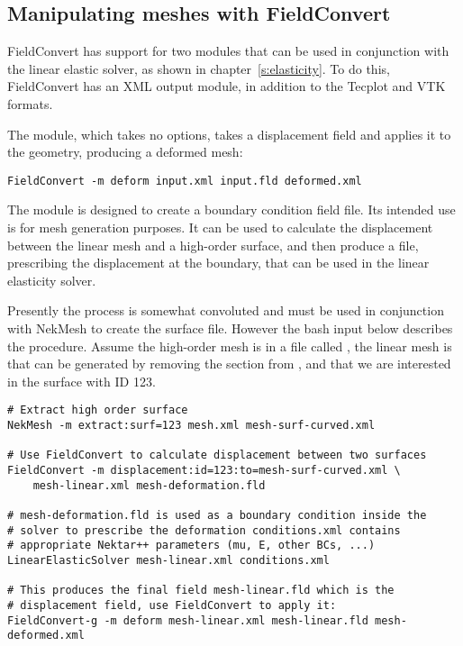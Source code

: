 \subsection{Manipulating meshes with FieldConvert}
FieldConvert has support for two modules that can be used in conjunction with
the linear elastic solver, as shown in chapter~\ref{s:elasticity}. To do this,
FieldConvert has an XML output module, in addition to the Tecplot and VTK
formats.

The  module, which takes no options, takes a displacement field
and applies it to the geometry, producing a deformed mesh:
\begin{lstlisting}[style=BashInputStyle]
FieldConvert -m deform input.xml input.fld deformed.xml
\end{lstlisting}

The  module is designed to create a boundary condition field
file. Its intended use is for mesh generation purposes. It can be used to
calculate the displacement between the linear mesh and a high-order surface, and
then produce a  file, prescribing the displacement at the boundary,
that can be used in the linear elasticity solver.

Presently the process is somewhat convoluted and must be used in conjunction
with NekMesh to create the surface file. However the bash input below
describes the procedure. Assume the high-order mesh is in a file called
, the linear mesh is  that can be
generated by removing the  section from , and that
we are interested in the surface with ID 123.

\begin{lstlisting}[style=BashInputStyle]
# Extract high order surface
NekMesh -m extract:surf=123 mesh.xml mesh-surf-curved.xml

# Use FieldConvert to calculate displacement between two surfaces
FieldConvert -m displacement:id=123:to=mesh-surf-curved.xml \
    mesh-linear.xml mesh-deformation.fld

# mesh-deformation.fld is used as a boundary condition inside the
# solver to prescribe the deformation conditions.xml contains
# appropriate Nektar++ parameters (mu, E, other BCs, ...)
LinearElasticSolver mesh-linear.xml conditions.xml

# This produces the final field mesh-linear.fld which is the
# displacement field, use FieldConvert to apply it:
FieldConvert-g -m deform mesh-linear.xml mesh-linear.fld mesh-deformed.xml
\end{lstlisting}

